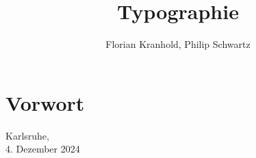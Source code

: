 \documentclass[ngerman]{scrbook}
\author{Florian Kranhold, Philip Schwartz}
\title {Typographie}
\begin{document}
\frontmatter


\chapter*{Vorwort}
\lipsum[1-2]

\begin{flushright}
  Karlsruhe,\\4. Dezember 2024
\end{flushright}

\mainmatter




\end{document}
